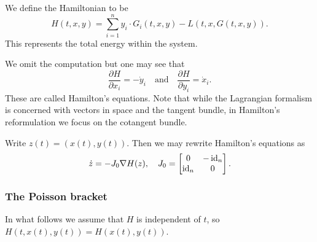 \begin{dfn}[Hamiltonian]
    We define the Hamiltonian to be
    \[H(t,x,y)=\sum_{i=1}^n y_i\cdot G_i(t,x,y)-L(t,x,G(t,x,y)).\]
    This represents the total energy within the system.
\end{dfn}

We omit the computation but one may see that
\[\frac{\partial H}{\partial x_i}=-\dot y_i\quad\text{and}\quad\frac{\partial H}{\partial y_i}=\dot x_i.\]
These are called Hamilton's equations.
Note that while the Lagrangian formalism is concerned with vectors in space and the tangent bundle, in Hamilton's reformulation we focus on the cotangent bundle.

Write $z(t)=(x(t),y(t))$.
Then we may rewrite Hamilton's equations as
\[\dot z=-J_0\nabla H(z),\quad J_0=\begin{bmatrix}
    0&-\operatorname{id}_n\\ \operatorname{id}_n&0
\end{bmatrix}.\]

\subsubsection*{The Poisson bracket}
In what follows we assume that $H$ is independent of $t$, so $H(t,x(t),y(t))=H(x(t),y(t))$.
